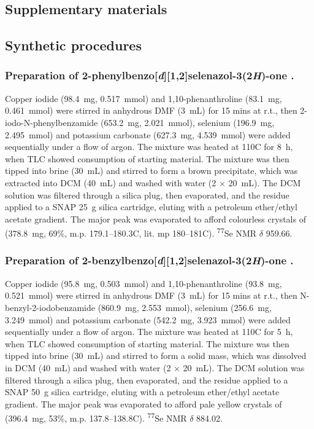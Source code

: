 \begin{refsection}
\section{Supplementary materials}

\subsection{Synthetic procedures}


\subsubsection[Preparation of \refcmpd{ebs.ph}.]{Preparation of 2-phenylbenzo[\emph{d}][1,2]selenazol-3(2\emph{H})-one .}

Copper iodide (98.4~mg, 0.517~mmol) and 1,10-phenanthroline (83.1~mg, 0.461~mmol) were stirred in anhydrous DMF (3~mL) for 15 mins at r.t., then 2-iodo-N-phenylbenzamide (653.2~mg, 2.021~mmol), selenium (196.9~mg, 2.495~mmol) and potassium carbonate (627.3~mg, 4.539~mmol) were added sequentially under a flow of argon. 
The mixture was heated at 110\degree C for 8~h, when TLC showed consumption of starting material. 
The mixture was then tipped into brine (30~mL) and stirred to form a brown precipitate, which was extracted into DCM (40~mL) and washed with water (2 $\times$ 20~mL). 
The DCM solution was filtered through a silica plug, then evaporated, and the residue applied to a SNAP 25~g silica cartridge, eluting with a petroleum ether/ethyl acetate gradient. 
The major peak was evaporated to afford colourless crystals of  (378.8~mg, 69\%, m.p. 179.1--180.3\degree C, lit. mp 180--181\degree C). \textsuperscript{77}Se NMR $\delta$ 959.66.

\subsubsection[Preparation of \refcmpd{ebs.bn}.]{Preparation of 2-benzylbenzo[\emph{d}][1,2]selenazol-3(2\emph{H})-one .}

Copper iodide (95.8~mg, 0.503~mmol) and 1,10-phenanthroline (93.8~mg, 0.521~mmol) were stirred in anhydrous DMF (3~mL) for 15 mins at r.t., then N-benzyl-2-iodobenzamide (860.9~mg, 2.553~mmol), selenium (256.6~mg, 3.249~mmol) and potassium carbonate (542.2~mg, 3.923~mmol) were added sequentially under a flow of argon. 
The mixture was heated at 110\degree C for 5~h, when TLC showed consumption of starting material. 
The mixture was then tipped into brine (30~mL) and stirred to form a solid mass, which was dissolved in DCM (40~mL) and washed with water (2 $\times$ 20~mL). 
The DCM solution was filtered through a silica plug, then evaporated, and the residue applied to a SNAP 50~g silica cartridge, eluting with a petroleum ether/ethyl acetate gradient. 
The major peak was evaporated to afford pale yellow crystals of  (396.4~mg, 53\%, m.p. 137.8--138.8\degree C). \textsuperscript{77}Se NMR $\delta$ 884.02.


\end{refsection}
